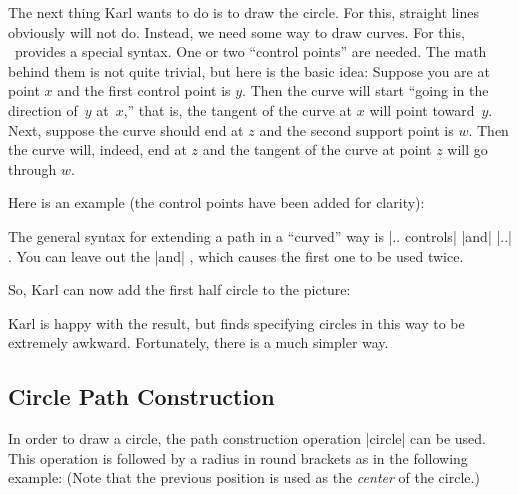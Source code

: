 The next thing Karl wants to do is to draw the circle. For this,
straight lines obviously will not do. Instead, we need some way to
draw curves. For this, \tikzname\ provides a special syntax. One or two
``control points'' are needed. The math behind them is not quite
trivial, but here is the basic idea: Suppose you are at point $x$ and
the first control point is $y$. Then the curve will start ``going in
the direction of~$y$ at~$x$,'' that is, the tangent of the curve at $x$
will point toward~$y$. Next, suppose the curve should end at $z$ and
the second support point is $w$. Then the curve will, indeed, end at
$z$ and the tangent of the curve at point $z$ will go through $w$.

Here is an example (the control points have been added for clarity):
\begin{codeexample}[]
\end{codeexample}

The general syntax for extending a path in a ``curved'' way is
|.. controls|  |and|  |..| . You can leave out the |and|
, which causes the first one to be used 
twice.

So, Karl can now add the first half circle to the picture:

\begin{codeexample}[]
\end{codeexample}

Karl is happy with the result, but finds specifying circles in this
way to be extremely awkward. Fortunately, there is a much simpler way.


\subsection{Circle Path Construction}

In order to draw a circle, the path construction operation |circle| can
be used. This operation is followed by a radius in round brackets as in
the following example: (Note that the previous position is used as the
\emph{center} of the circle.)

